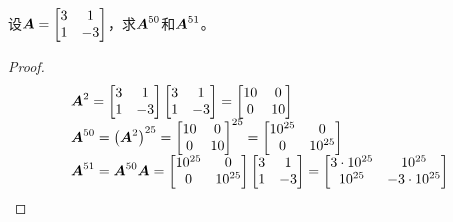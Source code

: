 \begin{problem}
设\(\boldsymbol{A}=\begin{bmatrix}3&1\\1&-3\end{bmatrix}\)，求\(\boldsymbol{A}^{50}\)和\(\boldsymbol{A}^{51}\)。
\end{problem}
\begin{proof}
    \begin{equation*}
        \begin{array}{lll}
            \boldsymbol{A}^2=\begin{bmatrix}3&1\\1&-3\end{bmatrix}\begin{bmatrix}3&1\\1&-3\end{bmatrix}=\begin{bmatrix}10&0\\0&10\end{bmatrix}      \\
            \boldsymbol{A}^{50}=\left( \boldsymbol{A}^2 \right)^{25}={\begin{bmatrix}10&0\\0&10\end{bmatrix}}^{25}=\begin{bmatrix}10^{25}&0\\0&10^{25}\end{bmatrix} \\
            \boldsymbol{A}^{51}=\boldsymbol{A}^{50}\boldsymbol{A}=\begin{bmatrix}10^{25}&0\\0&10^{25}\end{bmatrix}\begin{bmatrix}3&1\\1&-3\end{bmatrix}=\begin{bmatrix}3\cdot10^{25}&10^{25}\\10^{25}&-3\cdot10^{25}\end{bmatrix}
        \end{array}
    \end{equation*}
\end{proof}

